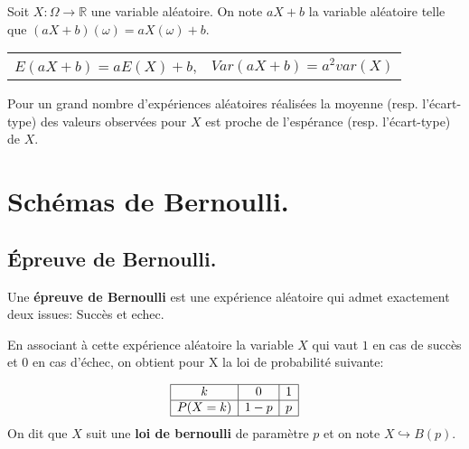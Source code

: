 \documentclass[a4paper,11pt]{article}
\theoremstyle{break}
\renewcommand\arraystretch{1.3}
\renewcommand\arraystretch{1.8}
\begin{document}
     \begin{theorem}
    Soit $X:\Omega \to \mathbb{R}$ une variable aléatoire. On note $aX+b$ la variable aléatoire
     telle que $(aX+b)(\omega)=aX(\omega)+b$.
     
      \begin{centering}
      \begin{tabular}{c c}
   $E(aX+b)=aE(X)+b$,& $Var(aX+b)=a^2 var(X)$ 
   \end{tabular}

   \end{centering}
     
   \end{theorem}
   
      \begin{theorem}
    
    Pour un grand nombre d'expériences aléatoires réalisées la moyenne (resp. l'écart-type)
    des valeurs observées pour $X$ est proche de l'espérance (resp. l'écart-type) de $X$.
    
   \end{theorem}
   
   \newpage
 
   
    \section{Schémas de Bernoulli.}
  \subsection{\'Epreuve de Bernoulli.}

  \begin{definition}
    Une \textbf{épreuve de Bernoulli} est une expérience aléatoire qui admet exactement deux issues:
    Succès et echec.
    
    En associant à cette expérience aléatoire la variable $X$ qui vaut $1$ en cas de succès et 
    $0$ en cas d'échec, on obtient pour X la loi de probabilité suivante:
     
     \renewcommand{\arraystretch}{1.5}
 $$
\begin{array}{|c|c|c|}

\hline
    k&0&1\\
    \hline
    P(X=k)&1-p&p\\
    \hline
    \end{array} 
$$   
     On dit que $X$ suit une \textbf{loi de bernoulli} de paramètre $p$ et on note $X \hookrightarrow B(p)$.
  \end{definition}
\end{document}
